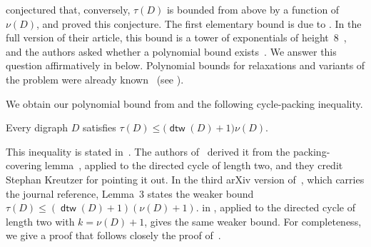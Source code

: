 \documentclass[fontsize=12pt,leading=14pt]{fullpaper}
\DeclareMathOperator{\dtw}{\mathsf{dtw}}
\begin{document}
\textcite{Younger73} conjectured that, conversely, $\tau(D)$ is bounded from above by a function of $\nu(D)$, and \textcite{ReedRST96} proved this conjecture.
The first elementary bound is due to \textcite{HKMM24}.
In the full version of their article, this bound is a tower of exponentials of height~$8$~\cite[Theorem~1.1]{HKMM26a}, and the authors asked whether a polynomial bound exists~\cite[Question~10.1]{HKMM26a}.
We answer this question affirmatively in  below.
Polynomial bounds for relaxations and variants of the problem were already known~\cite{MMPRS22,GSS26} (see ).

We obtain our polynomial bound from  and the following cycle-packing inequality.

\begin{lemma}\label{prop:cycle-packing}
  Every digraph $D$ satisfies $\tau(D)\le\bigl(\dtw(D)+1\bigr)\nu(D)$.
\end{lemma}

This inequality is stated in~\cite[conference version, Lemma~3]{MMPRS22}.
The authors of~\cite{MMPRS22} derived it from the packing-covering lemma~\cite[Lemma~4.2]{AKKW16}, applied to the directed cycle of length two, and they credit Stephan Kreutzer for pointing it out.
In the third arXiv version of~\cite{MMPRS22}, which carries the journal reference, Lemma~3 states the weaker bound $\tau(D)\le(\dtw(D)+1)(\nu(D)+1)$.
 in , applied to the directed cycle of length two with $k=\nu(D)+1$, gives the same weaker bound.
For completeness, we give a proof that follows closely the proof of~\cite[Lemma~4.2]{AKKW16}.
\end{document}
